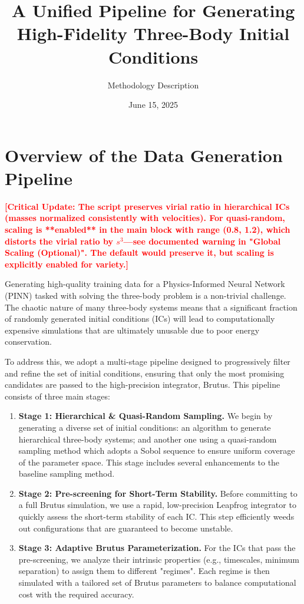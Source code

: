 \documentclass{article}
\title{A Unified Pipeline for Generating High-Fidelity Three-Body Initial Conditions}
\author{Methodology Description}
\date{June 15, 2025}
\newcommand{\authcomment}[1]{\textcolor{red}{\textbf{[#1]}}}
\begin{document}
\maketitle

\section*{Overview of the Data Generation Pipeline}

\authcomment{Critical Update: The script preserves virial ratio in hierarchical ICs (masses normalized consistently with velocities). For quasi-random, scaling is **enabled** in the main block with range (0.8, 1.2), which distorts the virial ratio by $s^3$—see documented warning in "Global Scaling (Optional)". The default would preserve it, but scaling is explicitly enabled for variety.}

Generating high-quality training data for a Physics-Informed Neural Network (PINN) tasked with solving the three-body problem is a non-trivial challenge. The chaotic nature of many three-body systems means that a significant fraction of randomly generated initial conditions (ICs) will lead to computationally expensive simulations that are ultimately unusable due to poor energy conservation.

To address this, we adopt a multi-stage pipeline designed to progressively filter and refine the set of initial conditions, ensuring that only the most promising candidates are passed to the high-precision integrator, Brutus. This pipeline consists of three main stages:
\begin{enumerate}
    \item \textbf{Stage 1: Hierarchical \& Quasi-Random Sampling.} We begin by generating a diverse set of initial conditions: an algorithm to generate hierarchical three-body systems; and another one using a quasi-random sampling method which adopts a Sobol sequence to ensure uniform coverage of the parameter space. This stage includes several enhancements to the baseline sampling method.
    \item \textbf{Stage 2: Pre-screening for Short-Term Stability.} Before committing to a full Brutus simulation, we use a rapid, low-precision Leapfrog integrator to quickly assess the short-term stability of each IC. This step efficiently weeds out configurations that are guaranteed to become unstable.
    \item \textbf{Stage 3: Adaptive Brutus Parameterization.} For the ICs that pass the pre-screening, we analyze their intrinsic properties (e.g., timescales, minimum separation) to assign them to different "regimes". Each regime is then simulated with a tailored set of Brutus parameters to balance computational cost with the required accuracy.
\end{enumerate}
\end{document}
